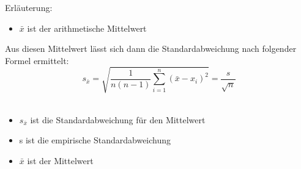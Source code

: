 	Erläuterung:
	\begin{itemize}
	\item $\bar{x}$ ist der arithmetische Mittelwert
	\end{itemize}
	
Aus diesen Mittelwert lässt sich dann die Standardabweichung nach folgender Formel ermittelt:
\\
\begin{equation}
		s_{\bar{x}} = \sqrt{\frac{1}{n(n-1)}\sum_{i=1}^n(\bar{x}-x_i)^2} =\frac{s}{\sqrt{n}}
\end{equation}
\\

\begin{itemize}
\item $s_{\bar{x}}$ ist die Standardabweichung für den Mittelwert
\item s ist die empirische Standardabweichung
\item $\bar{x}$ ist der Mittelwert
\end{itemize}

	
\pagebreak
